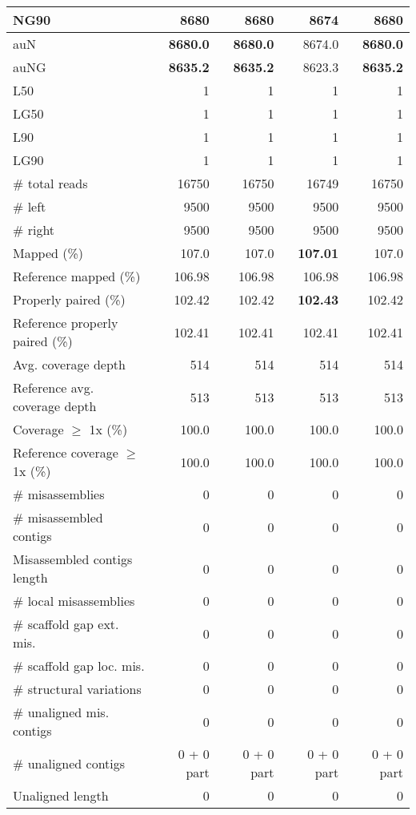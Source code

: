 \documentclass[12pt,a4paper]{article}
\begin{document}
\begin{table}[ht]
\begin{center}
\begin{tabular}{|l*{4}{|r}|}
NG90 & {\bf 8680} & {\bf 8680} & 8674 & {\bf 8680} \\ \hline
auN & {\bf 8680.0} & {\bf 8680.0} & 8674.0 & {\bf 8680.0} \\ \hline
auNG & {\bf 8635.2} & {\bf 8635.2} & 8623.3 & {\bf 8635.2} \\ \hline
L50 & 1 & 1 & 1 & 1 \\ \hline
LG50 & 1 & 1 & 1 & 1 \\ \hline
L90 & 1 & 1 & 1 & 1 \\ \hline
LG90 & 1 & 1 & 1 & 1 \\ \hline
\# total reads & 16750 & 16750 & 16749 & 16750 \\ \hline
\# left & 9500 & 9500 & 9500 & 9500 \\ \hline
\# right & 9500 & 9500 & 9500 & 9500 \\ \hline
Mapped (\%) & 107.0 & 107.0 & {\bf 107.01} & 107.0 \\ \hline
Reference mapped (\%) & 106.98 & 106.98 & 106.98 & 106.98 \\ \hline
Properly paired (\%) & 102.42 & 102.42 & {\bf 102.43} & 102.42 \\ \hline
Reference properly paired (\%) & 102.41 & 102.41 & 102.41 & 102.41 \\ \hline
Avg. coverage depth & 514 & 514 & 514 & 514 \\ \hline
Reference avg. coverage depth & 513 & 513 & 513 & 513 \\ \hline
Coverage $\geq$ 1x (\%) & 100.0 & 100.0 & 100.0 & 100.0 \\ \hline
Reference coverage $\geq$ 1x (\%) & 100.0 & 100.0 & 100.0 & 100.0 \\ \hline
\# misassemblies & 0 & 0 & 0 & 0 \\ \hline
\# misassembled contigs & 0 & 0 & 0 & 0 \\ \hline
Misassembled contigs length & 0 & 0 & 0 & 0 \\ \hline
\# local misassemblies & 0 & 0 & 0 & 0 \\ \hline
\# scaffold gap ext. mis. & 0 & 0 & 0 & 0 \\ \hline
\# scaffold gap loc. mis. & 0 & 0 & 0 & 0 \\ \hline
\# structural variations & 0 & 0 & 0 & 0 \\ \hline
\# unaligned mis. contigs & 0 & 0 & 0 & 0 \\ \hline
\# unaligned contigs & 0 + 0 part & 0 + 0 part & 0 + 0 part & 0 + 0 part \\ \hline
Unaligned length & 0 & 0 & 0 & 0 \\ \hline

\end{tabular}
\end{center}
\end{table}
\end{document}
